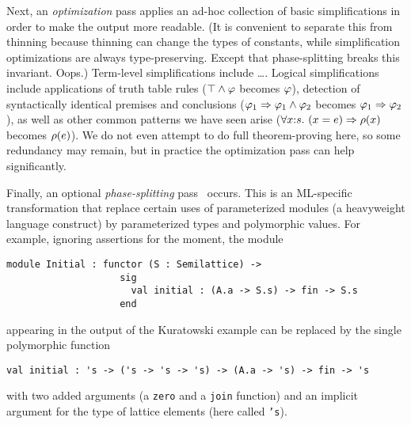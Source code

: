 Next, an \emph{optimization} pass applies an ad-hoc collection of basic simplifications in order to make the output more readable.  (It is convenient to separate this from thinning because thinning can change the types of constants, while simplification optimizations are always type-preserving.  Except that phase-splitting breaks this invariant.  Oops.)  Term-level simplifications include \ldots.
Logical simplifications include applications of truth table rules ($\top\land \varphi$ becomes $\varphi$), detection of syntactically identical premises and conclusions ($\varphi_1\Rightarrow \varphi_1\land \varphi_2$ becomes $\varphi_1\Rightarrow \varphi_2$), as well as other common patterns we have seen arise
($\forall x{:}s.\ (x = e)\Rightarrow \rho(x)$ becomes $\rho(e)$).  We do not even attempt to do full theorem-proving here, so some redundancy may remain, but in practice the optimization pass can help significantly.

Finally, an optional \emph{phase-splitting} pass~\cite{harper+:popl90} occurs.  This is an ML-specific transformation that replace certain uses of parameterized modules (a heavyweight language construct) by parameterized types and polymorphic values.  For example, ignoring assertions for the moment, the module
\begin{Verbatim}
module Initial : functor (S : Semilattice) ->
                    sig
                      val initial : (A.a -> S.s) -> fin -> S.s
                    end	
\end{Verbatim}   
appearing in the output of the Kuratowski example can be replaced by the single polymorphic function
\begin{Verbatim}
val initial : 's -> ('s -> 's -> 's) -> (A.a -> 's) -> fin -> 's	
\end{Verbatim}
with two added arguments (a \texttt{zero} and a \texttt{join} function) and an implicit argument for the type of lattice elements (here called \texttt{'s}).

\label{sec:typechecking}




